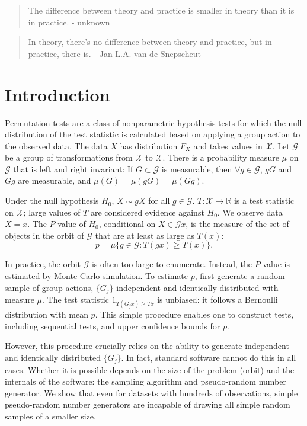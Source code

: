 \documentclass[graybox]{svmult}
\begin{document}
\begin{quotation}
The difference between theory and practice is smaller in theory than it is in practice. - unknown
\end{quotation}


\begin{quotation}
In theory, there's no difference between theory and practice, but in practice, there is. - Jan L.A. van de Snepscheut
\end{quotation}

\section{Introduction}
\label{sec:introduction}

Permutation tests are a class of nonparametric hypothesis tests for which the null distribution of the
test statistic is calculated based on applying a group action to the observed data.
The data $X$ has distribution $F_X$ and takes values in $\mathcal{X}$.
Let $\mathcal{G}$ be a group of transformations from $\mathcal{X}$ to $\mathcal{X}$.
There is a probability measure $\mu$ on $\mathcal{G}$ that is left and right invariant: 
If $G \subset \mathcal{G}$ is measurable, then $\forall g \in \mathcal{G}$, $gG$ and $Gg$ are measurable, 
and $\mu(G) = \mu(gG) = \mu(Gg)$.

Under the null hypothesis $H_0$, $X \sim gX$ for all $g \in \mathcal{G}$.
$T: \mathcal{X} \rightarrow \mathbb{R}$ is a test statistic on $\mathcal{X}$; 
large values of $T$ are considered evidence against $H_0$.
We observe data $X = x$.
The $P$-value of $H_0$, conditional on $X \in \mathcal{G}x$, is the measure of the
set of objects in the orbit of $\mathcal{G}$ that are at least as large as $T(x)$:
$$p = \mu \{g \in \mathcal{G}: T(gx) \ge T(x) \}.$$

In practice, the orbit $\mathcal{G}$ is often too large to enumerate.
Instead, the $P$-value is estimated by Monte Carlo simulation.
To estimate $p$, first generate a random sample of group actions,
$\{ G_j \}$ independent and identically distributed with measure $\mu$.
The test statistic $1_{T(G_jx) \ge Tx}$ is unbiased:
it follows a Bernoulli distribution with mean $p$.
This simple procedure enables one to construct tests, including sequential tests,
and upper confidence bounds for $p$.

However, this procedure crucially relies on the ability to generate independent and
identically distributed $\{ G_j \}$.
In fact, standard software cannot do this in all cases.
Whether it is possible depends on the size of the problem (orbit) and the internals of the software:
the sampling algorithm and pseudo-random number generator.
We show that even for datasets with hundreds of observations, simple pseudo-random number generators
are incapable of drawing all simple random samples of a smaller size.
\end{document}
